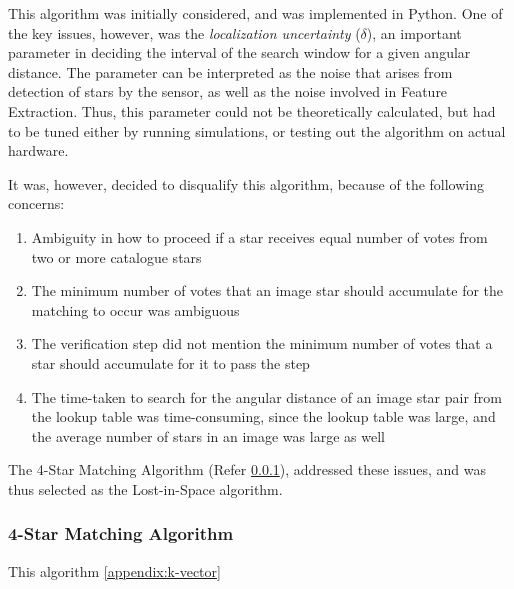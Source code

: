 
This algorithm was initially considered, and was implemented in Python.
One of the key issues, however, was the \textit{localization uncertainty} ($\delta$), an important parameter in deciding the interval of the search window for a given angular distance. 
The parameter can be interpreted as the noise that arises from detection of stars by the sensor, as well as the noise involved in Feature Extraction. Thus, this parameter could not be theoretically calculated, but had to be tuned either by running simulations, or testing out the algorithm on actual hardware.

It was, however, decided to disqualify this algorithm, because of the following concerns:
\begin{enumerate}
    \item Ambiguity in how to proceed if a star receives equal number of votes from two or more catalogue stars
    
    \item The minimum number of votes that an image star should accumulate for the matching to occur was ambiguous
    
    \item The verification step did not mention the minimum number of votes that a star should accumulate for it to pass the step
    
    \item The time-taken to search for the angular distance of an image star pair from the lookup table was time-consuming, since the lookup table was large, and the average number of stars in an image was large as well 
\end{enumerate}

The 4-Star Matching Algorithm (Refer \ref{sec:4SM}), addressed these issues, and was thus selected as the Lost-in-Space algorithm.


\subsubsection{4-Star Matching Algorithm}
\label{sec:4SM}

This algorithm \cite{dong2006brightness} \ref{appendix:k-vector}
